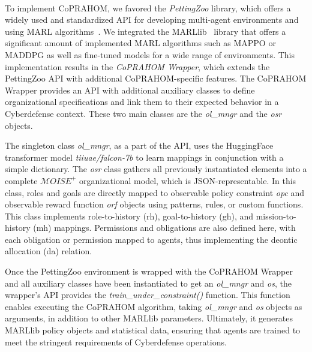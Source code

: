 \documentclass[conference]{IEEEtran}
\newcounter{relation}
\begin{document}

\

To implement CoPRAHOM, we favored the \emph{PettingZoo} library, which offers a widely used and standardized API for developing multi-agent environments and using MARL algorithms~\cite{Terry2021}. We integrated the MARLlib~\cite{hu2022marllib} library that offers a significant amount of implemented MARL algorithms such as MAPPO or MADDPG as well as fine-tuned models for a wide range of environments. This implementation results in the \textit{CoPRAHOM Wrapper}, which extends the PettingZoo API with additional CoPRAHOM-specific features.
%
The CoPRAHOM Wrapper provides an API with additional auxiliary classes to define organizational specifications and link them to their expected behavior in a Cyberdefense context. These two main classes are the \textit{ol\_mngr} and the \textit{osr} objects.

The singleton class \textit{ol\_mngr}, as a part of the API, uses the HuggingFace transformer model \textit{tiiuae/falcon-7b} to learn mappings in conjunction with a simple dictionary.
The \textit{osr} class gathers all previously instantiated elements into a complete $\mathcal{M}OISE^+$ organizational model, which is JSON-representable. In this class, roles and goals are directly mapped to observable policy constraint \textit{opc} and observable reward function \textit{orf} objects using patterns, rules, or custom functions. This class implements role-to-history (rh), goal-to-history (gh), and mission-to-history (mh) mappings. Permissions and obligations are also defined here, with each obligation or permission mapped to agents, thus implementing the deontic allocation (da) relation.

Once the PettingZoo environment is wrapped with the CoPRAHOM Wrapper and all auxiliary classes have been instantiated to get an \textit{ol\_mngr} and \textit{os}, the wrapper's API provides the \textit{train\_under\_constraint()} function. This function enables executing the CoPRAHOM algorithm, taking \textit{ol\_mngr} and \textit{os} objects as arguments, in addition to other MARLlib parameters. Ultimately, it generates MARLlib policy objects and statistical data, ensuring that agents are trained to meet the stringent requirements of Cyberdefense operations.
\end{document}
